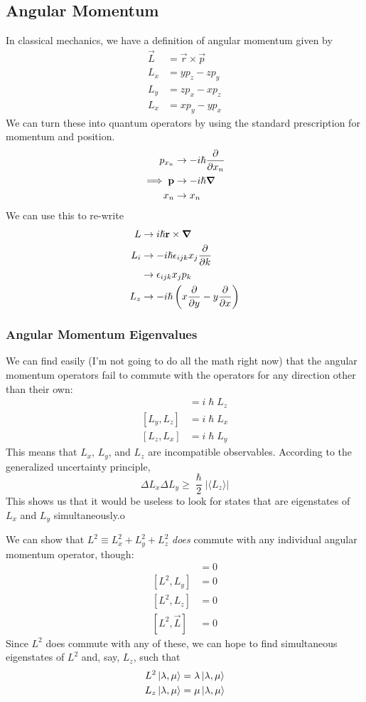 \documentclass[a4paper]{article}
\begin{document}
\subsection{Angular Momentum}
In classical mechanics, we have a definition of angular momentum given by
\begin{align*}
	\vec{L} &= \vec{r}\times\vec{p}\\
	L_x &= yp_z-zp_y\\
	L_y&=zp_x-xp_z\\
	L_x&=xp_y-yp_x
\end{align*}
We can turn these into quantum operators by using the standard prescription for
momentum and position.
\begin{align*}
p_{x_n} &\to -i\hslash\pd{x_n}\\
\implies \vec{p} &\to -i\hslash\del\\
x_n &\to x_n
\end{align*}
We can use this to re-write
\begin{align*}
	L &\to i\hslash\vec{r}\times\del\\
	L_i &\to -i\hslash\epsilon_{ijk}x_j\pd{k}\\
	    &\to \epsilon_{ijk}x_jp_k\\
	L_z &\to -i\hslash\left(x\pd{y}-y\pd{x}\right)
\end{align*}

\subsubsection{Angular Momentum Eigenvalues}
We can find easily (I'm not going to do all the math right now) that the
angular momentum operators fail to commute with the operators for any direction
other than their own:
\begin{align*}
	[L_x,L_y] &= i\hslash L_z\\
	[L_y,L_z] &= i\hslash L_x\\
	[L_z,L_x] &= i\hslash L_y
\end{align*}
This means that $L_x$, $L_y$, and $L_z$ are incompatible observables. According
to the generalized uncertainty principle,
\[ \Delta L_x \Delta L_y \geq \frac{\hslash}{2}\lvert\langle L_z\rangle\rvert\]
This shows us that it would be useless to look for states that are eigenstates
of $L_x$ and $L_y$ simultaneously.o

We can show that $L^2 \equiv L_x^2+L_y^2+L_z^2$ \emph{does} commute with
any individual angular momentum operator, though:
\begin{align*}
	[L^2,L_x] &= 0\\
	[L^2,L_y] &= 0\\
	[L^2,L_z] &= 0\\
	[L^2, \vec{L}] &= 0
\end{align*}
Since $L^2$ does commute with any of these, we can hope to find simultaneous
eigenstates of $L^2$ and, say, $L_z$, such that
\begin{align*}
	L^2\left\lvert \lambda,\mu\right\rangle &= \lambda\left\lvert \lambda,\mu\right\rangle\\
	L_z\left\lvert \lambda,\mu\right\rangle &= \mu\left\lvert \lambda,\mu\right\rangle
\end{align*}
\end{document}
